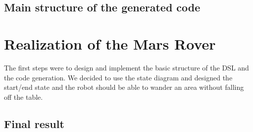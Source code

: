 \documentclass[10pt,a4paper]{article}
\begin{document}
\subsection*{Main structure of the generated code}

\section*{Realization of the Mars Rover}
The first steps were to design and implement the basic structure of the DSL and the code generation. We decided to use the state diagram and designed the start/end state and the robot should be able to wander an area without falling off the table. 

\subsection*{Final result}
\end{document}
